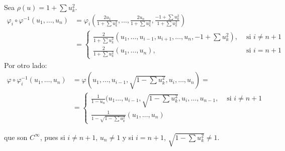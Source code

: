 \documentclass[twoside]{article}
\begin{document}
\begin{solucion}
Sea $ρ(u)=1+\sum u_k^2$.
\begin{align*}
	φ_i \circ φ^{-1} (u_1,\dots,u_n) & = φ_i\left(\frac{2u_1}{1+\sum u_k^2}, \dots, \frac{2u_n}{1+\sum u_k^2}, \frac{-1+\sum u_k^2}{1+\sum u_k^2}\right)\\
	& = \begin{cases}
	\frac{2}{1+\sum u_k^2}(u_1, \dots, u_{i-1},u_{i+1},\dots,u_n, -1+\sum u_k^2), &\text{ si }i \neq n+1 \\
	\frac{2}{1+\sum u_k^2}(u_1, \dots,u_n), &\text{ si }i = n+1
\end{cases}
\end{align*}
Por otro lado:
\begin{align*}
	φ \circ φ_i^{-1}(u_1,\dots,u_n) & = φ(u_1,\dots,u_{i-1},\sqrt{1-\sum u_k^2},u_i,\dots,u_n) =\\
	& = \begin{cases}
	\frac{1}{1-u_n}(u_1\dots,u_{i-1},\sqrt{1-\sum u_k^2},u_i,\dots,u_{n-1}, &\text{ si }i \neq n+1\\
	\frac{1}{1-\sqrt{1-\sum u_k^2}}(u_1,\dots,u_n)
\end{cases}
\end{align*}

que son $C^{∞}$, pues si $i \neq n+1$, $u_n \neq 1$ y si $i = n+1$, $\sqrt{1-\sum u_k^2} \neq 1$.

\end{solucion}

\newpage
\end{document}
